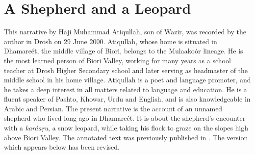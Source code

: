 \appendix
{}

\section*{A Shepherd and a Leopard}

This narrative by Haji Muhammad Atiqullah, son of Wazir, was recorded by the author in Drosh on 29 June 2000. Atiqullah, whose home is situated in Dhamareét, the middle village of Biori, belongs to the Mulaakoór lineage. He is the most learned person of Biori Valley, working for many years as a school teacher at Drosh Higher Secondary school and later serving as headmaster of the middle school in his home village. Atiqullah is a poet and language promoter, and he takes a deep interest in all matters related to language and education. He is a fluent speaker of Pashto, Khowar, Urdu and English, and is also knowledgeable in Arabic and Persian. The present narrative is the account of an unnamed shepherd who lived long ago in Dhamareét. It is about the shepherd’s encounter with a \textit{karáaṛu}, a snow leopard, while taking his flock to graze on the slopes high above Biori Valley. The annotated text was previously published in \citet[182--187]{liljegrenhaider2015}. The version which appears below has been revised.

